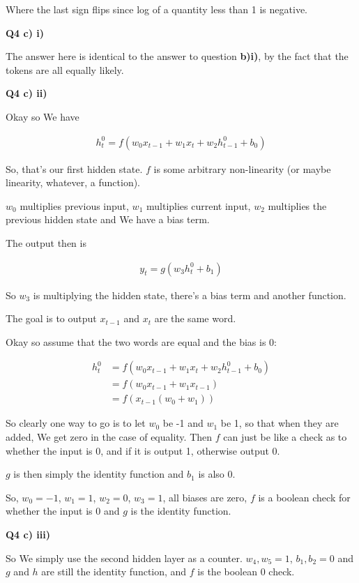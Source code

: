 \documentclass{article}
\begin{document}
	Where the last sign flips since log of a quantity less than 1 is negative. 

\textbf{Q4 c) i)}

	The answer here is identical to the answer to question \textbf{b)i)}, by the fact that the tokens are all equally likely.
	
	
\textbf{Q4 c) ii)}

	Okay so We have
	
	\begin{align}
		h^0_t = f(w_0x_{t-1} + w_1 x_t + w_2h^0_{t-1} + b_0)
	\end{align}
	
	So, that's our first hidden state. $f$ is some arbitrary non-linearity (or maybe linearity, whatever, a function).
	
	$w_0$ multiplies previous input, $w_1$ multiplies current input, $w_2$ multiplies the previous hidden state and We have a bias term. 
	
	The output then is
	
	\begin{align}
		y_t = g(w_3h^0_t + b_1)
	\end{align}
	
	So $w_3$ is multiplying the hidden state, there's a bias  term and another function. 
	
	The goal is to output $x_{t-1}$ and $x_t$ are the same word.
	
	Okay so assume that  the two words are equal and the bias is 0:
	
	\begin{align}
		h^0_t &= f(w_0x_{t-1} + w_1 x_t + w_2h^0_{t-1} + b_0)\\
		&= f(w_0x_{t-1} + w_1 x_{t-1})\\
		&= f(x_{t-1}(w_0+w_1))
	\end{align}
	
	So clearly one way to go is to let $w_0$ be -1 and $w_1$ be 1, so that when they are added, We get zero in the case of equality. Then $f$ can just be like a check as to whether the input is 0, and if it is output 1, otherwise output 0.
	
	$g$ is then simply the identity function and $b_1$ is also 0.
	
	So, $w_0 = -1$, $w_1 = 1$, $w_2 = 0$, $w_3=1$, all biases are zero, $f$ is a boolean check for whether the input is $0$ and $g$ is the identity function.
	
\textbf{Q4 c) iii)}	

	So We simply use the second hidden layer as a counter. $w_4, w_5=1$, $b_1, b_2 = 0$ and $g$ and $h$ are still the identity function, and $f$ is the boolean 0 check.	
\end{document}

